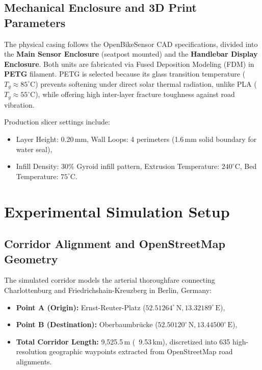\subsection{Mechanical Enclosure and 3D Print Parameters}
\label{sec:enclosure_specs}
The physical casing follows the OpenBikeSensor CAD specifications, divided into the \textbf{Main Sensor Enclosure} (seatpost mounted) and the \textbf{Handlebar Display Enclosure}. Both units are fabricated via Fused Deposition Modeling (FDM) in \textbf{PETG} filament. PETG is selected because its glass transition temperature ($T_g \approx 85^\circ\text{C}$) prevents softening under direct solar thermal radiation, unlike PLA ($T_g \approx 55^\circ\text{C}$), while offering high inter-layer fracture toughness against road vibration.

Production slicer settings include:
\begin{itemize}
    \item Layer Height: 0.20\,mm, Wall Loops: 4 perimeters (1.6\,mm solid boundary for water seal),
    \item Infill Density: 30\% Gyroid infill pattern, Extrusion Temperature: $240^\circ\text{C}$, Bed Temperature: $75^\circ\text{C}$.
\end{itemize}

\section{Experimental Simulation Setup}
\label{sec:simulation_setup}

\subsection{Corridor Alignment and OpenStreetMap Geometry}
The simulated corridor models the arterial thoroughfare connecting Charlottenburg and Friedrichshain-Kreuzberg in Berlin, Germany:
\begin{itemize}
    \item \textbf{Point A (Origin):} Ernst-Reuter-Platz ($52.51264^\circ\,\text{N}, 13.32189^\circ\,\text{E}$),
    \item \textbf{Point B (Destination):} Oberbaumbr{\"u}cke ($52.50120^\circ\,\text{N}, 13.44500^\circ\,\text{E}$),
    \item \textbf{Total Corridor Length:} 9,525.5\,m (~9.53\,km), discretized into 635 high-resolution geographic waypoints extracted from OpenStreetMap road alignments.
\end{itemize}

